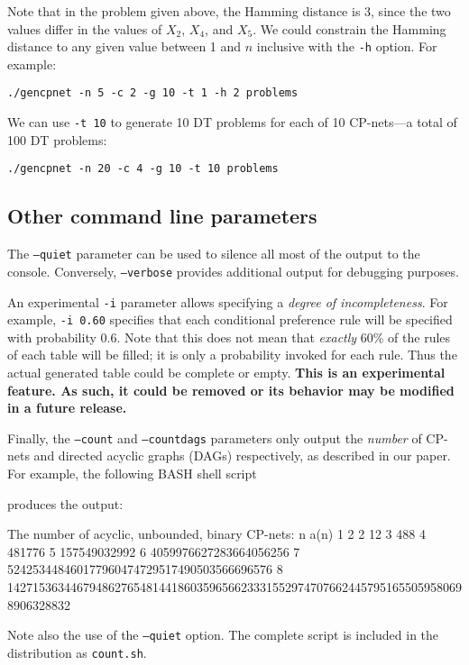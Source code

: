 \documentclass{article}
\begin{document}
Note that in the problem given above, the Hamming distance is 3, since
the two values differ in the values of $X_2$, $X_4$, and $X_5$.  We
could constrain the Hamming distance to any given value between 1 and
$n$ inclusive with the \verb|-h| option.  For example:

\begin{verbatim}
./gencpnet -n 5 -c 2 -g 10 -t 1 -h 2 problems
\end{verbatim}

We can use \verb|-t 10| to generate 10 DT problems for each of 10
CP-nets---a total of 100 DT problems:
\begin{verbatim}
./gencpnet -n 20 -c 4 -g 10 -t 10 problems
\end{verbatim}

\subsection{Other command line parameters}

The \texttt{--quiet} parameter can be used to silence all most of the
output to the console.  Conversely, \texttt{--verbose} provides
additional output for debugging purposes. 

An experimental \texttt{-i} parameter allows specifying a \emph{degree
  of incompleteness}.  For example, \texttt{-i 0.60} specifies that
each conditional preference rule will be specified with probability
0.6.  Note that this does not mean that \emph{exactly} 60\% of the
rules of each table will be filled; it is only a probability invoked
for each rule.  Thus the actual generated table could be complete or
empty.  \textbf{This is an experimental feature.  As such, it could be
  removed or its behavior may be modified in a future release.}

Finally, the \texttt{--count} and \texttt{--countdags} parameters only
output the \emph{number} of CP-nets and directed acyclic graphs (DAGs)
respectively, as described in our paper.  For example, the following
BASH shell script
produces the output:
\begin{verbnobox}[\small]
The number of acyclic, unbounded, binary CP-nets:
n    a(n)
1    2
2    12
3    488
4    481776
5    157549032992
6    4059976627283664056256
7    524253448460177960474729517490503566696576
8    1427153634467948627654814418603596566233315529747076624457951655059580698906328832
\end{verbnobox}
Note also the use of the \texttt{--quiet} option.
The complete script is included in the distribution as \texttt{count.sh}. 
\end{document}
